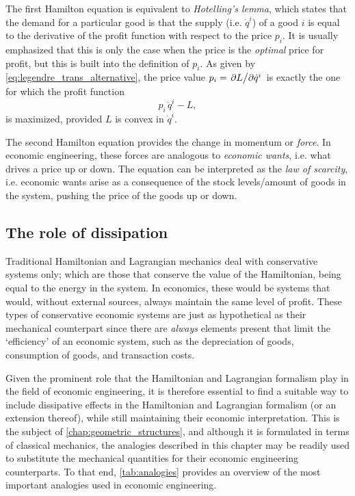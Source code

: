 The first Hamilton equation is equivalent to \emph{Hotelling's lemma}, which states that the demand for a particular good is that the supply (i.e. \(\dot{q}^i\)) of a good \(i\) is equal to the derivative of the profit function with respect to the price \(p_i\). It is usually emphasized that this is only the case when the price is the \emph{optimal} price for profit, but this is built into the definition of \(p_i\). As given by \cref{eq:legendre_trans_alternative}, the price value \(p_i = \pdv*{L}{\dot{q}^i}\) is exactly the one for which the profit function
\begin{equation}
     p_i\,\dot{q}^i - L,
\end{equation}
is maximized, provided \(L\) is convex in \(\dot{q}^i\). 

The second Hamilton equation provides the change in momentum or \emph{force}. In economic engineering, these forces are analogous to \emph{economic wants}, i.e. what drives a price up or down. The equation can be interpreted as the \emph{law of scarcity}, i.e. economic wants arise as a consequence of the stock levels/amount of goods in the system, pushing the price of the goods up or down.

\subsection{The role of dissipation} 
Traditional Hamiltonian and Lagrangian mechanics deal with conservative systems only; which are those that conserve the value of the Hamiltonian, being equal to the energy in the system. In economics, these would be systems that would, without external sources, always maintain the same level of profit. These types of conservative economic systems are just as hypothetical as their mechanical counterpart since there are \emph{always} elements present that limit the `efficiency' of an economic system, such as the depreciation of goods, consumption of goods, and transaction costs. 

Given the prominent role that the Hamiltonian and Lagrangian formalism play in the field of economic engineering, it is therefore essential to find a suitable way to include dissipative effects in the Hamiltonian and Lagrangian formalism (or an extension thereof), while still maintaining their economic interpretation. This is the subject of \cref{chap:geometric_structures}, and although it is formulated in terms of classical mechanics, the analogies described in this chapter may be readily used to substitute the mechanical quantities for their economic engineering counterparts. To that end, \cref{tab:analogies} provides an overview of the most important analogies used in economic engineering.

